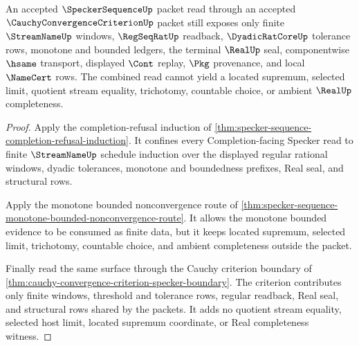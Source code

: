 \begin{theorem}
\label{thm:speckersequence-cauchy-criterion-nonlocated-boundary}
An accepted $\SpeckerSequenceUp$ packet read through an accepted $\CauchyConvergenceCriterionUp$ packet still exposes only finite $\StreamNameUp$ windows, $\RegSeqRatUp$ readback, $\DyadicRatCoreUp$ tolerance rows, monotone and bounded ledgers, the terminal $\RealUp$ seal, componentwise $\hsame$ transport, displayed $\Cont$ replay, $\Pkg$ provenance, and local $\NameCert$ rows. The combined read cannot yield a located supremum, selected limit, quotient stream equality, trichotomy, countable choice, or ambient $\RealUp$ completeness.
\end{theorem}
\begin{proof}
Apply the completion-refusal induction of \autoref{thm:specker-sequence-completion-refusal-induction}. It confines every Completion-facing Specker read to finite $\StreamNameUp$ schedule induction over the displayed regular rational windows, dyadic tolerances, monotone and boundedness prefixes, Real seal, and structural rows.

Apply the monotone bounded nonconvergence route of \autoref{thm:specker-sequence-monotone-bounded-nonconvergence-route}. It allows the monotone bounded evidence to be consumed as finite data, but it keeps located supremum, selected limit, trichotomy, countable choice, and ambient completeness outside the packet.

Finally read the same surface through the Cauchy criterion boundary of \autoref{thm:cauchy-convergence-criterion-specker-boundary}. The criterion contributes only finite windows, threshold and tolerance rows, regular readback, Real seal, and structural rows shared by the packets. It adds no quotient stream equality, selected host limit, located supremum coordinate, or Real completeness witness.
\end{proof}

